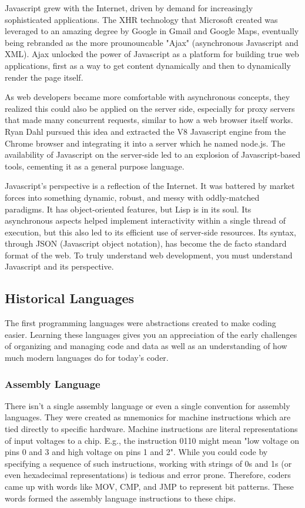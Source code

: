 Javascript grew with the Internet, driven by demand for increasingly
sophisticated applications. The XHR technology that Microsoft created was
leveraged to an amazing degree by Google in Gmail and Google Maps, eventually
being rebranded as the more prounouncable "Ajax" (asynchronous Javascript and
XML). Ajax unlocked the power of Javascript as a platform for building true web
applications, first as a way to get content dynamically and then to dynamically
render the page itself.

As web developers became more comfortable with asynchronous concepts, they
realized this could also be applied on the server side, especially for proxy
servers that made many concurrent requests, similar to how a web browser itself
works. Ryan Dahl pursued this idea and extracted the V8 Javascript engine from
the Chrome browser and integrating it into a server which he named node.js. The
availability of Javascript on the server-side led to an explosion of
Javascript-based tools, cementing it as a general purpose language.

Javascript's perspective is a reflection of the Internet. It was battered by
market forces into something dynamic, robust, and messy with oddly-matched
paradigms. It has object-oriented features, but Lisp is in its soul. Its
asynchronous aspects helped implement interactivity within a single thread of
execution, but this also led to its efficient use of server-side resources. Its
syntax, through JSON (Javascript object notation), has become the de facto
standard format of the web. To truly understand web development, you must
understand Javascript and its perspective.

\subsection{Historical Languages}

The first programming languages were abstractions created to make coding
easier. Learning these languages gives you an appreciation of the early
challenges of organizing and managing code and data as well as an understanding
of how much modern languages do for today's coder.

\subsubsection{Assembly Language}

There isn't a single assembly language or even a single convention for assembly
languages. They were created as mnemonics for machine instructions which are
tied directly to specific hardware. Machine instructions are literal
representations of input voltages to a chip. E.g., the instruction 0110 might
mean "low voltage on pins 0 and 3 and high voltage on pins 1 and 2". While you
could code by specifying a sequence of such instructions, working with strings
of 0s and 1s (or even hexadecimal representations) is tedious and error prone.
Therefore, coders came up with words like MOV, CMP, and JMP to represent bit
patterns. These words formed the assembly language instructions to these chips.

